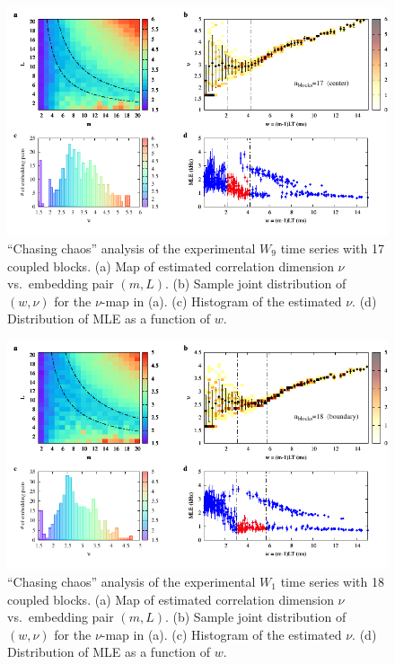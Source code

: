 \begin{appendices}
\begin{figure}[!htbp]
    \centering
    \includegraphics[width=\linewidth]{../blocks/17_blocks/middle/2e5_points/plots/chaos_low.pdf}
    \caption{``Chasing chaos'' analysis of the experimental $W_9$ time series with 17 coupled blocks.
    (a) Map of estimated correlation dimension $\nu$ vs.\ embedding pair $(m, L)$.
    (b) Sample joint distribution of $(w,\nu)$ for the $\nu$-map in (a).
    (c) Histogram of the estimated $\nu$. (d) Distribution of MLE as a function of $w$.
    } 
\end{figure}

\begin{figure}[!htbp]
    \centering
    \includegraphics[width=\linewidth]{../blocks/18_blocks/2e5_points/plots/chaos_low.pdf}
    \caption{``Chasing chaos'' analysis of the experimental $W_1$ time series with 18 coupled blocks.
    (a) Map of estimated correlation dimension $\nu$ vs.\ embedding pair $(m, L)$.
    (b) Sample joint distribution of $(w,\nu)$ for the $\nu$-map in (a).
    (c) Histogram of the estimated $\nu$. (d) Distribution of MLE as a function of $w$.
    } 
\end{figure}


\end{appendices}
